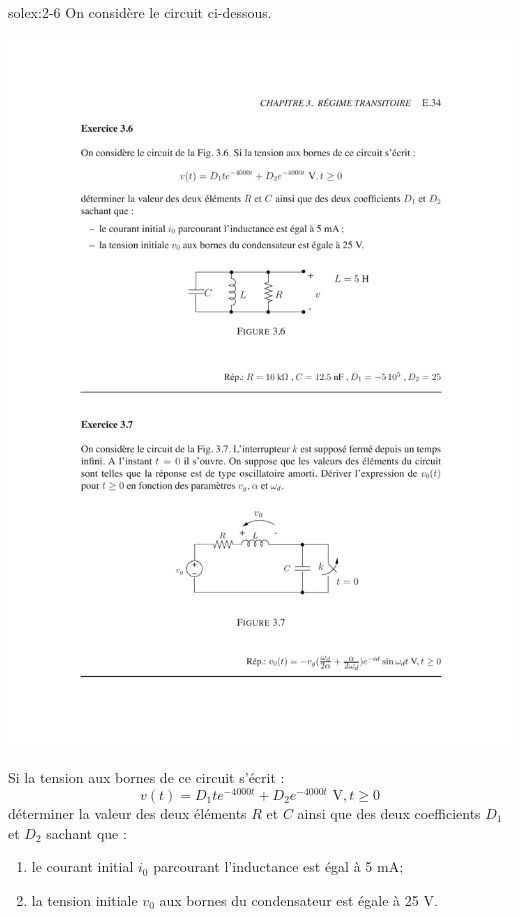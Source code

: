 \begin{exwithsol}{}{solex:2-6}
	\label{ex:2-6}
On consid\`ere le circuit ci-dessous.
\begin{center}
	\includegraphics[width=0.6\linewidth]{exercices/ex-3-6}
\end{center} 
Si la tension aux bornes de ce circuit s'\'ecrit :
\[v(t)=D_1te^{-4000t}+D_2e^{-4000t}\,\, \mbox{V}, t\geq 0\]
d\'eterminer la valeur des deux \'el\'ements $R$ et $C$ ainsi que des deux
coefficients $D_1$ et $D_2$ sachant que :
\begin{enumerate}
	\item le courant initial $i_0$ parcourant l'inductance est \'egal \`a 5 mA;
	\item la tension initiale $v_0$ aux bornes du condensateur est \'egale \`a 25 V.
\end{enumerate}
\end{exwithsol}

